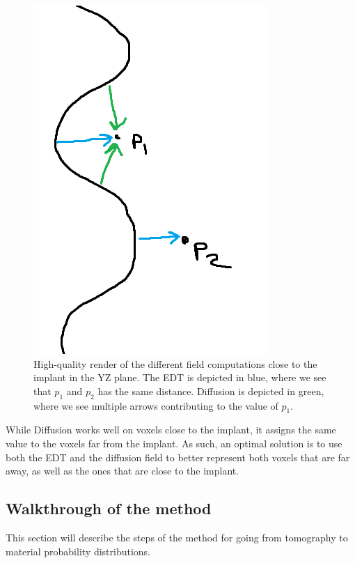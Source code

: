\begin{figure}
    \centering
    \includegraphics[width=.7\linewidth]{figures/edt-diffusion.png}
    \caption{High-quality render of the different field computations close to the implant in the YZ plane. The EDT is depicted in blue, where we see that $p_1$ and $p_2$ has the same distance. Diffusion is depicted in green, where we see multiple arrows contributing to the value of $p_1$. }
    \label{fig:edt-vs-diffusion}
\end{figure}

While Diffusion works well on voxels close to the implant, it assigns the same value to the voxels far from the implant. As such, an optimal solution is to use both the EDT and the diffusion field to better represent both voxels that are far away, as well as the ones that are close to the implant.


\subsection{Walkthrough of the method}
This section will describe the steps of the method for going from tomography to material probability distributions.

